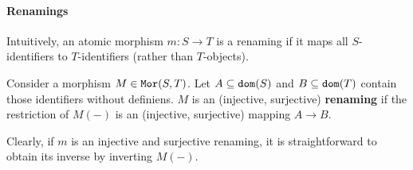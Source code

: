 %
%
%

\paragraph{Renamings}
Intuitively, an atomic morphism $m:S\to T$ is a renaming if it maps all $S$-identifiers to $T$-identifiers (rather than $T$-objects).

\begin{definition}[Renaming]
Consider a morphism $M\in\mathtt{Mor}(S,T)$.
Let $A\subseteq\mathtt{dom}(S)$ and $B\subseteq\mathtt{dom}(T)$ contain those identifiers without definiens.
$M$ is an (injective, surjective) \textbf{renaming} if the restriction of $M(-)$ is an (injective, surjective) mapping $A\to B$.
\end{definition}

Clearly, if $m$ is an injective and surjective renaming, it is straightforward to obtain its inverse by inverting $M(-)$.

